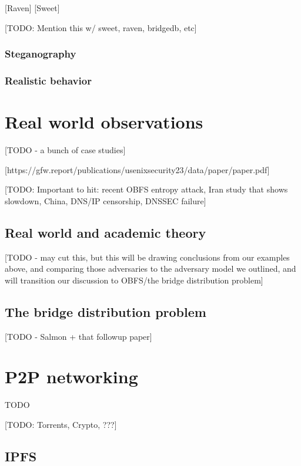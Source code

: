 \documentclass[12pt]{report}
\begin{document}
[Raven] [Sweet]

[TODO: Mention this w/ sweet, raven, bridgedb, etc]

\subsubsection{Steganography}

\subsubsection{Realistic behavior}

\section{Real world observations}
\label{real}

[TODO - a bunch of case studies]

[https://gfw.report/publications/usenixsecurity23/data/paper/paper.pdf]

[TODO: Important to hit: recent OBFS entropy attack, Iran study that shows slowdown, China, DNS/IP censorship, DNSSEC failure]

\subsection{Real world and academic theory}

[TODO - may cut this, but this will be drawing conclusions from our examples above, and comparing those adversaries to the adversary model we outlined, and will transition our discussion to OBFS/the bridge distribution problem]

\subsection{The bridge distribution problem}
\label{distribution}

[TODO - Salmon + that followup paper]

\section{P2P networking}

TODO

[TODO: Torrents, Crypto, ???]

\subsection{IPFS}
\end{document}
